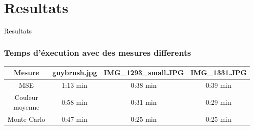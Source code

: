 \documentclass[handout]{beamer}
\begin{document}
\section{Resultats}

\begin{frame}
\begin{center}
{\Huge Resultats}
\end{center}
\end{frame}


\begin{frame}
\frametitle{\bf Temps d'\'execution avec des mesures differents}
\begin{table}
\begin{tabular}{|c|c|c|c|}
\hline 
\small Mesure & \small guybrush.jpg & \small IMG\_1293\_small.JPG & \small IMG\_1331.JPG \\ 
\hline 
\small MSE & 1:13 min & 0:38 min & 0:39 min \\ 
\hline 
\small Couleur moyenne & 0:58 min & 0:31 min & 0:29 min \\ 
\hline 
\small Monte Carlo & 0:47 min & 0:25 min & 0:25 min \\ 
\hline 

\end{tabular}
\label{tab:temps}  
\end{table}
\end{frame}
\end{document}

